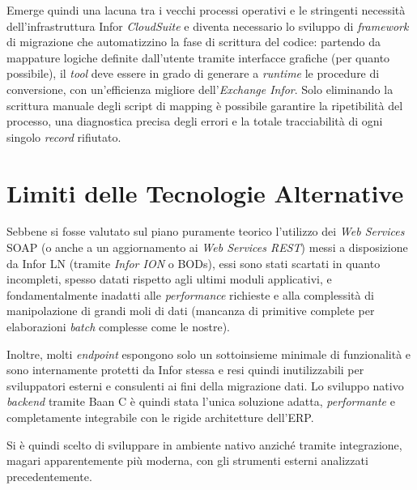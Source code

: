 Emerge quindi una lacuna tra i vecchi processi operativi e le stringenti necessità dell'infrastruttura Infor \textit{CloudSuite} e
diventa necessario lo sviluppo di \textit{framework} di migrazione che automatizzino la fase di scrittura del codice: partendo da mappature logiche
definite dall'utente tramite interfacce grafiche (per quanto possibile), il \textit{tool} deve essere in grado di generare a \textit{runtime} 
le procedure di conversione, con un'efficienza migliore dell'\textit{Exchange Infor}.
Solo eliminando la scrittura manuale degli script di mapping è possibile garantire la ripetibilità del processo,
una diagnostica precisa degli errori e la totale tracciabilità di ogni singolo \textit{record} rifiutato.

\section{Limiti delle Tecnologie Alternative}\label{sec:limiti-delle-tecnologie-alternative}
Sebbene si fosse valutato sul piano puramente teorico l'utilizzo dei \textit{Web Services} SOAP (o anche a un aggiornamento
ai \textit{Web Services REST}) messi a disposizione da Infor LN (tramite \textit{Infor ION} o BODs),
essi sono stati scartati in quanto incompleti, spesso datati rispetto agli ultimi moduli applicativi, e
fondamentalmente inadatti alle \textit{performance} richieste e alla complessità di manipolazione di grandi moli di dati
(mancanza di primitive complete per elaborazioni \textit{batch} complesse come le nostre).

Inoltre, molti \textit{endpoint} espongono solo un sottoinsieme minimale di funzionalità e sono internamente protetti
da Infor stessa e resi quindi inutilizzabili per sviluppatori esterni e consulenti ai fini della migrazione dati.
Lo sviluppo nativo \textit{backend} tramite Baan C è quindi stata l'unica soluzione adatta, \textit{performante} e completamente integrabile con le rigide architetture dell'ERP\@.

Si è quindi scelto di sviluppare in ambiente nativo anziché tramite integrazione, magari apparentemente più moderna, con gli strumenti esterni analizzati precedentemente.
